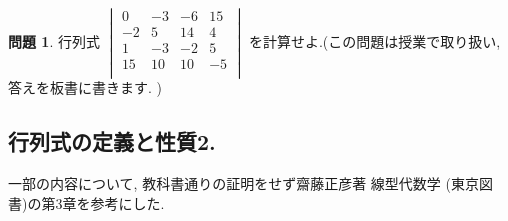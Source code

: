 \documentclass[dvipdfmx,a4paper,11pt]{article}
\theoremstyle{definition}
\newtheorem{ques}[thm]{問題}
\begin{document}
\begin{ques}

行列式
$
\begin{vmatrix}
 0& -3& -6 &15 \\
 -2& 5& 14 &4 \\
 1& -3& -2 &5 \\
 15 & 10& 10 &-5 \\
 \end{vmatrix} 
 $
 を計算せよ.(この問題は授業で取り扱い, 答えを板書に書きます. )
\end{ques}

\subsection{行列式の定義と性質2.  \cite[3.3]{M}}

一部の内容について, 教科書通りの証明をせず齋藤正彦著 線型代数学 (東京図書)の第3章を参考にした.
\end{document}
